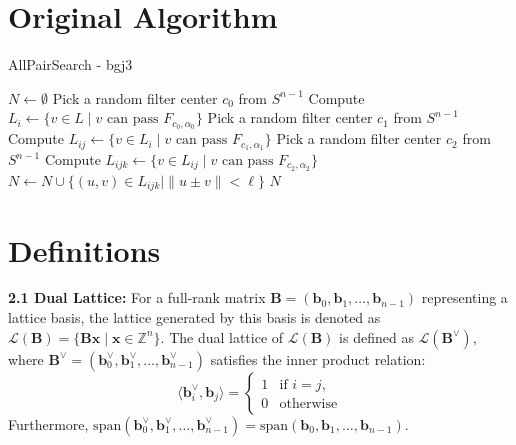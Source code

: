 \documentclass{article}
\begin{document}
\section{Original Algorithm}

\begin{algorithm}
\caption{AllPairSearch - bgj3} \label{alg:all_pair_search}
\begin{algorithmic}[1]
\State $N \gets \emptyset$
    \State Pick a random filter center $c_0$ from $S^{n-1}$
    \State Compute $L_i \gets \{ v \in L \mid v \text{ can pass } F_{c_0, \alpha_0} \}$
        \State Pick a random filter center $c_1$ from $S^{n-1}$
        \State Compute $L_{ij} \gets \{ v \in L_i \mid v \text{ can pass } F_{c_1, \alpha_1} \}$
            \State Pick a random filter center $c_2$ from $S^{n-1}$
            \State Compute $L_{ijk} \gets \{ v \in L_{ij} \mid v \text{ can pass } F_{c_2, \alpha_2} \}$
            \State $N \gets N \cup \{ (u, v) \in L_{ijk} \mid \|u \pm v\| < \ell \}$
        \EndFor
    \EndFor
\EndFor
\State \Return $N$
\end{algorithmic}
\end{algorithm}

\section{Definitions}

\textbf{2.1 Dual Lattice:} For a full-rank matrix $\mathbf{B} = (\mathbf{b}_0, \mathbf{b}_1, \ldots, \mathbf{b}_{n-1})$ representing a lattice basis, the lattice generated by this basis is denoted as $\mathcal{L}(\mathbf{B}) = \{ \mathbf{Bx} \mid \mathbf{x} \in \mathbb{Z}^n \}$. The dual lattice of $\mathcal{L}(\mathbf{B})$ is defined as $\mathcal{L}(\mathbf{B}^{\vee})$, where $\mathbf{B}^{\vee} = (\mathbf{b}_0^{\vee}, \mathbf{b}_1^{\vee}, \ldots, \mathbf{b}_{n-1}^{\vee})$ satisfies the inner product relation:
\[
\langle \mathbf{b}_i^{\vee}, \mathbf{b}_j \rangle = \begin{cases} 1 & \text{if } i = j, \\ 0 & \text{otherwise} \end{cases}
\]
Furthermore, $\text{span}(\mathbf{b}_0^{\vee}, \mathbf{b}_1^{\vee}, \ldots, \mathbf{b}_{n-1}^{\vee}) = \text{span}(\mathbf{b}_0, \mathbf{b}_1, \ldots, \mathbf{b}_{n-1})$.\\
\end{document}
